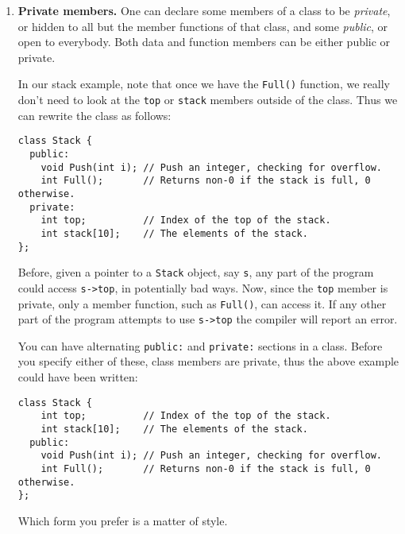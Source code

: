 \begin{enumerate}
\begin{verbatim}
int
Stack::Full()
{
    return (top == 10);
}
\end{verbatim}
Now we can rewrite {\tt Push} this way:
\begin{verbatim}
void
Stack::Push(int i)
{
    if (Full()) {
        fprintf(stderr, "Error: Stack overflow\n");
        exit(1);
    }
    
    stack[top++] = i;
}
\end{verbatim}
We could have written the line with {\tt Full()} this way also:
\begin{verbatim}
    if (this->Full()) {
\end{verbatim}
but in a member function, the \verb+this->+ is implicit.

The purpose of member functions is to encapsulate the functionality of
a type of object along with the data that the object contains.  A
member function does not take up space in an object of the class.

\item {\bf Private members.}  One can declare some
members of a class to be {\it private}, or hidden to all but
the member functions of that class, and some {\it public}, or open to
everybody.  Both data and function members can be either public or
private.

In our stack example, note that once we have the {\tt Full()}
function, we really don't need to look at the {\tt top} or {\tt stack}
members outside of the class.  Thus we can rewrite the class as
follows:
\begin{verbatim}
class Stack {
  public:
    void Push(int i); // Push an integer, checking for overflow.
    int Full();       // Returns non-0 if the stack is full, 0 otherwise.
  private:
    int top;          // Index of the top of the stack.
    int stack[10];    // The elements of the stack.
};
\end{verbatim}
Before, given a pointer to a {\tt Stack} object, say {\tt s}, any part
of the program could access {\tt s->top}, in potentially bad ways.
Now, since the {\tt top} member is private, only a member function,
such as {\tt Full()}, can access it.  If any other part of the
program attempts to use {\tt s->top} the compiler will report an error.

You can have alternating {\tt public:} and {\tt private:} sections in
a class.  Before you specify either of these, class members are
private, thus the above example could have been written:
\begin{verbatim}
class Stack {
    int top;          // Index of the top of the stack.
    int stack[10];    // The elements of the stack.
  public:
    void Push(int i); // Push an integer, checking for overflow.
    int Full();       // Returns non-0 if the stack is full, 0 otherwise.
};
\end{verbatim}
Which form you prefer is a matter of style.


\end{enumerate}
